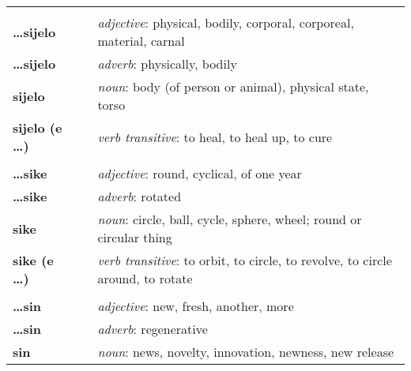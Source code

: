 \begin{supertabular}{p{2,5cm}|ll}
                                 &  &                                                                                                            \\
    \textbf{\dots sijelo}        &  & \textit{adjective}: physical, bodily, corporal, corporeal, material, carnal                                \\
    \textbf{\dots sijelo}        &  & \textit{adverb}: physically, bodily                                                                        \\
    \textbf{sijelo}              &  & \textit{noun}: body (of person or animal), physical state, torso                                           \\
    \textbf{sijelo (e \dots)}    &  & \textit{verb transitive}: to heal, to heal up, to cure                                                     \\
                                 &  &                                                                                                            \\
    \textbf{\dots sike}          &  & \textit{adjective}: round, cyclical, of one year                                                           \\
    \textbf{\dots sike}          &  & \textit{adverb}: rotated                                                                                   \\
    \textbf{sike}                &  & \textit{noun}: circle, ball, cycle, sphere, wheel; round or circular thing                                 \\
    \textbf{sike (e \dots)}      &  & \textit{verb transitive}: to orbit, to circle, to revolve, to circle around, to rotate                     \\
                                 &  &                                                                                                            \\
    \textbf{\dots sin}           &  & \textit{adjective}: new, fresh, another, more                                                              \\
    \textbf{ \dots sin }         &  & \textit{adverb}: regenerative                                                                              \\
    \textbf{sin}                 &  & \textit{noun}: news, novelty, innovation, newness, new release                                             \\

\end{supertabular}
